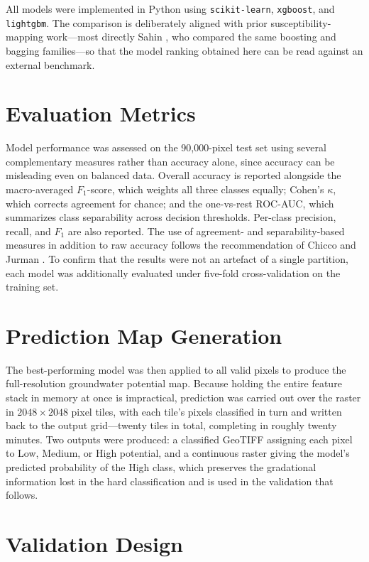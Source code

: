 All models were implemented in Python using \texttt{scikit-learn},
\texttt{xgboost}, and \texttt{lightgbm}. The comparison is deliberately aligned
with prior susceptibility-mapping work---most directly Sahin
\cite{sahin2020ensembletree}, who compared the same boosting and bagging
families---so that the model ranking obtained here can be read against an
external benchmark.

\section{Evaluation Metrics}
\label{sec:metrics}

Model performance was assessed on the 90,000-pixel test set using several
complementary measures rather than accuracy alone, since accuracy can be
misleading even on balanced data. Overall accuracy is reported alongside the
macro-averaged $F_1$-score, which weights all three classes equally; Cohen's
$\kappa$, which corrects agreement for chance; and the one-vs-rest ROC-AUC, which
summarizes class separability across decision thresholds. Per-class precision,
recall, and $F_1$ are also reported. The use of agreement- and
separability-based measures in addition to raw accuracy follows the
recommendation of Chicco and Jurman \cite{chicco2020mcc}. To confirm that the
results were not an artefact of a single partition, each model was additionally
evaluated under five-fold cross-validation on the training set.

\section{Prediction Map Generation}
\label{sec:prediction}

The best-performing model was then applied to all \npixels{} valid pixels to
produce the full-resolution groundwater potential map. Because holding the entire
feature stack in memory at once is impractical, prediction was carried out over
the raster in $2048 \times 2048$ pixel tiles, with each tile's pixels classified
in turn and written back to the output grid---twenty tiles in total, completing in
roughly twenty minutes. Two outputs were produced: a classified GeoTIFF assigning
each pixel to Low, Medium, or High potential, and a continuous raster giving the
model's predicted probability of the High class, which preserves the gradational
information lost in the hard classification and is used in the validation that
follows.

\section{Validation Design}
\label{sec:validation_design}

